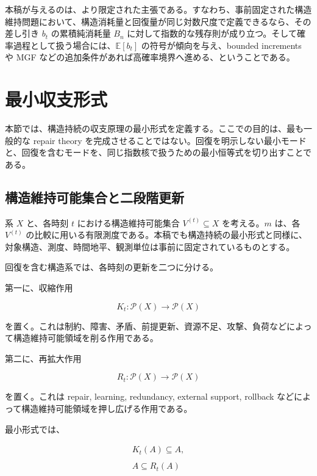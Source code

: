 \documentclass[12pt,a4paper]{article}
\begin{document}
本稿が与えるのは、より限定された主張である。すなわち、事前固定された構造維持問題において、構造消耗量と回復量が同じ対数尺度で定義できるなら、その差し引き \(b_{t}\) の累積純消耗量 \(B_{n}\) に対して指数的な残存則が成り立つ。そして確率過程として扱う場合には、\(\mathbb E[b_{t}]\) の符号が傾向を与え、bounded increments や MGF などの追加条件があれば高確率境界へ進める、ということである。

\section{最小収支形式}\label{ux6700ux5c0fux53ceux652fux5f62ux5f0f}

本節では、構造持続の収支原理の最小形式を定義する。ここでの目的は、最も一般的な repair theory を完成させることではない。回復を明示しない最小モードと、回復を含むモードを、同じ指数核で扱うための最小恒等式を切り出すことである。

\subsection{構造維持可能集合と二段階更新}\label{ux69cbux9020ux7dadux6301ux53efux80fdux96c6ux5408ux3068ux4e8cux6bb5ux968eux66f4ux65b0}

系 \(X\) と、各時刻 \(t\) における構造維持可能集合 \(V^{(t)}\subseteq X\) を考える。\(m\) は、各 \(V^{(t)}\) の比較に用いる有限測度である。本稿でも構造持続の最小形式と同様に、対象構造、測度、時間地平、観測単位は事前に固定されているものとする。

回復を含む構造系では、各時刻の更新を二つに分ける。

第一に、収縮作用

\[
K_{t} : \mathcal P(X) \to \mathcal P(X)
\]

を置く。これは制約、障害、矛盾、前提更新、資源不足、攻撃、負荷などによって構造維持可能領域を削る作用である。

第二に、再拡大作用

\[
R_{t} : \mathcal P(X) \to \mathcal P(X)
\]

を置く。これは repair, learning, redundancy, external support, rollback などによって構造維持可能領域を押し広げる作用である。

最小形式では、

\[
\begin{aligned}
K_{t}(A) \subseteq A, \\
\qquad \\
A \subseteq R_{t}(A)
\end{aligned}
\]
\end{document}

